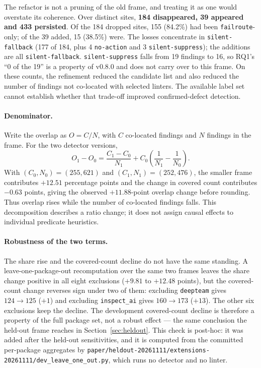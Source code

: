 \documentclass[10pt,a4paper]{article}
\begin{document}
The refactor is not a pruning of the old frame, and treating it as one would
overstate its coherence. Over distinct sites, \textbf{184 disappeared, 39 appeared
and 433 persisted}. Of the 184 dropped sites, 155 (84.2\%) had been
\texttt{failroute}-only; of the 39 added, 15 (38.5\%) were. The losses concentrate
in \texttt{silent-fallback} (177 of 184, plus 4 \texttt{no-action} and 3
\texttt{silent-suppress}); the additions are all \texttt{silent-fallback}.
\texttt{silent-suppress} falls from 19 findings to 16, so RQ1's ``0 of the 19'' is
a property of v0.8.0 and does not carry over to this frame. On these counts, the refinement reduced the candidate list and also reduced
the number of findings not co-located with selected linters. The available label
set cannot establish whether that trade-off improved confirmed-defect detection.

\paragraph{Denominator.}
Write the overlap as $O=C/N$, with $C$ co-located findings and $N$ findings
in the frame. For the two detector versions,
\[
 O_1-O_0=\frac{C_1-C_0}{N_1}
          +C_0\left(\frac{1}{N_1}-\frac{1}{N_0}\right).
\]
With $(C_0,N_0)=(255,621)$ and $(C_1,N_1)=(252,476)$, the smaller frame
contributes $+12.51$ percentage points and the change in covered count
contributes $-0.63$ points, giving the observed $+11.88$-point overlap
change before rounding. Thus overlap rises while the number of co-located
findings falls. This decomposition describes a ratio change; it does not
assign causal effects to individual predicate heuristics.

\paragraph{Robustness of the two terms.}
The share rise and the covered-count decline do not have the same standing.
A leave-one-package-out recomputation over the same two frames leaves the
share change positive in all eight exclusions ($+9.81$ to $+12.48$ points),
but the covered-count change reverses sign under two of them: excluding
\texttt{deepteam} gives $124 \rightarrow 125$ ($+1$) and excluding
\texttt{inspect\_ai} gives $160 \rightarrow 173$ ($+13$). The other six
exclusions keep the decline. The development covered-count decline is
therefore a property of the full package set, not a robust effect --- the
same conclusion the held-out frame reaches in Section~\ref{sec:heldout}.
This check is post-hoc: it was added after the held-out sensitivities, and
it is computed from the committed per-package aggregates by
\texttt{paper/heldout-20261111/extensions-20261111/dev\_leave\_one\_out.py},
which runs no detector and no linter.
\end{document}

